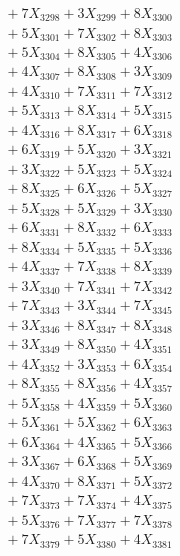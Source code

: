 \documentclass[a4paper,10pt]{article}
\begin{document}
{\begin{align}
&\;  + 7 X_{3298} + 3 X_{3299} + 8 X_{3300} \\[0.3ex]
&\;  + 5 X_{3301} + 7 X_{3302} + 8 X_{3303} \\[0.3ex]
&\;  + 5 X_{3304} + 8 X_{3305} + 4 X_{3306} \\[0.3ex]
&\;  + 4 X_{3307} + 8 X_{3308} + 3 X_{3309} \\[0.5ex]\allowbreak
&\;  + 4 X_{3310} + 7 X_{3311} + 7 X_{3312} \\[0.3ex]
&\;  + 5 X_{3313} + 8 X_{3314} + 5 X_{3315} \\[0.3ex]
&\;  + 4 X_{3316} + 8 X_{3317} + 6 X_{3318} \\[0.3ex]
&\;  + 6 X_{3319} + 5 X_{3320} + 3 X_{3321} \\[0.3ex]
&\;  + 3 X_{3322} + 5 X_{3323} + 5 X_{3324} \\[0.3ex]
&\;  + 8 X_{3325} + 6 X_{3326} + 5 X_{3327} \\[0.3ex]
&\;  + 5 X_{3328} + 5 X_{3329} + 3 X_{3330} \\[0.3ex]
&\;  + 6 X_{3331} + 8 X_{3332} + 6 X_{3333} \\[0.3ex]
&\;  + 8 X_{3334} + 5 X_{3335} + 5 X_{3336} \\[0.3ex]
&\;  + 4 X_{3337} + 7 X_{3338} + 8 X_{3339} \\[0.5ex]\allowbreak
&\;  + 3 X_{3340} + 7 X_{3341} + 7 X_{3342} \\[0.3ex]
&\;  + 7 X_{3343} + 3 X_{3344} + 7 X_{3345} \\[0.3ex]
&\;  + 3 X_{3346} + 8 X_{3347} + 8 X_{3348} \\[0.3ex]
&\;  + 3 X_{3349} + 8 X_{3350} + 4 X_{3351} \\[0.3ex]
&\;  + 4 X_{3352} + 3 X_{3353} + 6 X_{3354} \\[0.3ex]
&\;  + 8 X_{3355} + 8 X_{3356} + 4 X_{3357} \\[0.3ex]
&\;  + 5 X_{3358} + 4 X_{3359} + 5 X_{3360} \\[0.3ex]
&\;  + 5 X_{3361} + 5 X_{3362} + 6 X_{3363} \\[0.3ex]
&\;  + 6 X_{3364} + 4 X_{3365} + 5 X_{3366} \\[0.3ex]
&\;  + 3 X_{3367} + 6 X_{3368} + 5 X_{3369} \\[0.5ex]\allowbreak
&\;  + 4 X_{3370} + 8 X_{3371} + 5 X_{3372} \\[0.3ex]
&\;  + 7 X_{3373} + 7 X_{3374} + 4 X_{3375} \\[0.3ex]
&\;  + 5 X_{3376} + 7 X_{3377} + 7 X_{3378} \\[0.3ex]
&\;  + 7 X_{3379} + 5 X_{3380} + 4 X_{3381} \\[0.3ex]

\end{align}}
\end{document}
